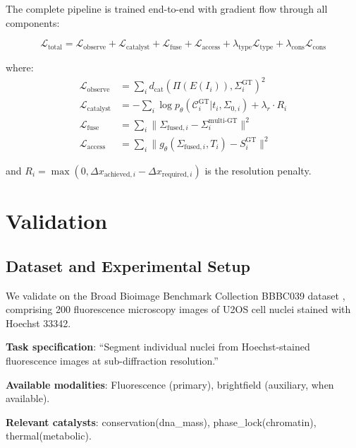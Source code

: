 \documentclass[11pt,twocolumn,a4paper]{article}
\theoremstyle{definition}
\theoremstyle{remark}
\newcommand{\dcat}{d_{\mathrm{cat}}}
\newcommand{\Sig}{\Sigma}
\newcommand{\loss}{\mathcal{L}}
\newcommand{\params}{\theta}
\begin{document}
The complete pipeline is trained end-to-end with gradient flow through all components:

\begin{equation}
\loss_{\text{total}} = \loss_{\text{observe}} + \loss_{\text{catalyst}} + \loss_{\text{fuse}} + \loss_{\text{access}} + \lambda_{\text{type}} \loss_{\text{type}} + \lambda_{\text{cons}} \loss_{\text{cons}}
\end{equation}

where:
\begin{align}
\loss_{\text{observe}} &= \sum_i \dcat(\Pi(E(I_i)), \Sig_i^{\text{GT}})^2 \\
\loss_{\text{catalyst}} &= -\sum_i \log p_\params(\mathcal{C}_i^{\text{GT}} | t_i, \Sig_{0,i}) + \lambda_r \cdot R_i \\
\loss_{\text{fuse}} &= \sum_i \|\Sig_{\text{fused},i} - \Sig_i^{\text{multi-GT}}\|^2 \\
\loss_{\text{access}} &= \sum_i \|g_\params(\Sig_{\text{fused},i}, T_i) - S_i^{\text{GT}}\|^2
\end{align}

and $R_i = \max(0, \Delta x_{\text{achieved},i} - \Delta x_{\text{required},i})$ is the resolution penalty.

\section{Validation}
\label{sec:validation}

\subsection{Dataset and Experimental Setup}

We validate on the Broad Bioimage Benchmark Collection BBBC039 dataset \cite{BBBC039}, comprising 200 fluorescence microscopy images of U2OS cell nuclei stained with Hoechst 33342.

\textbf{Task specification}: ``Segment individual nuclei from Hoechst-stained fluorescence images at sub-diffraction resolution.''

\textbf{Available modalities}: Fluorescence (primary), brightfield (auxiliary, when available).

\textbf{Relevant catalysts}: conservation(dna\_mass), phase\_lock(chromatin), thermal(metabolic).
\end{document}
